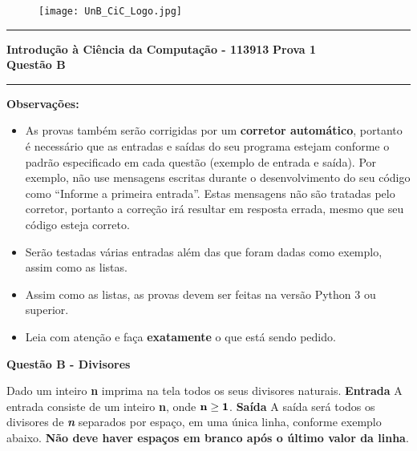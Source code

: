 \documentclass[a4paper, 12pt]{article}
\begin{document}
\begin{figure}[H]
	\texttt{[image: UnB\_CiC\_Logo.jpg]}
\end{figure}
\noindent\rule{\textwidth}{0.4pt}
\begin{center}
	\textbf{{\Large Introdução à Ciência da Computação - 113913}} \newline \newline
	\textbf{{\large Prova 1} \\
	\vspace{9pt}
	{\large Questão B}} \\
	\noindent\rule{\textwidth}{0.4pt}
	\newline
\end{center}

\textbf{{\large Observações:}}
\begin{itemize}
	\item As provas também serão corrigidas por um \textbf{corretor automático}, portanto é necessário que as entradas e saídas do seu programa estejam conforme o padrão especificado em cada questão (exemplo de entrada e saída). Por exemplo, não use mensagens escritas durante o desenvolvimento do seu código como “Informe a primeira entrada”. Estas mensagens não são tratadas pelo corretor, portanto a correção irá resultar em resposta errada, mesmo que seu código esteja correto.
	\item Serão testadas várias entradas além das que foram dadas como exemplo, assim como as listas.
	\item Assim como as listas, as provas devem ser feitas na versão Python 3 ou superior.
	\item Leia com atenção e faça \textbf{exatamente} o que está sendo pedido.
\end{itemize}
\newpage %
\begin{center}
\textbf{{\Large Questão B - Divisores}}
\end{center}
\vspace{5pt}
Dado um inteiro \textbf{n} imprima na tela todos os seus divisores naturais.
\newline \newline
\textbf{{\large Entrada}} \newline
A entrada consiste de um inteiro \textbf{n}, onde $\textrm{\textbf{n}} \geq \textrm{\textbf{1}}$.
\newline \newline
\textbf{{\large Saída}} \newline
A saída será todos os divisores de \textbf{\textit{n}} separados por espaço, em uma única linha, conforme exemplo abaixo. \textbf{Não deve haver espaços em branco após o último valor da linha}.
\end{document}
